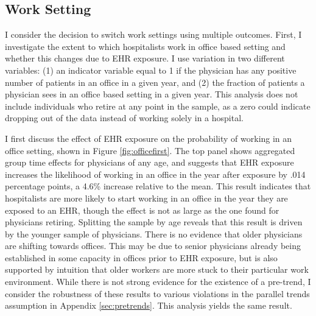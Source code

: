 \documentclass[12pt]{article}
\begin{document}
\subsection{Work Setting}

 I consider the decision to switch work settings using multiple outcomes. First, I investigate the extent to which hospitalists work in office based setting and whether this changes due to EHR exposure. I use variation in two different variables: (1) an indicator variable equal to 1 if the physician has any positive number of patients in an office in a given year, and (2) the fraction of patients a physician sees in an office based setting in a given year. This analysis does not include individuals who retire at any point in the sample, as a zero could indicate dropping out of the data instead of working solely in a hospital. 

I first discuss the effect of EHR exposure on the probability of working in an office setting, shown in Figure \ref{fig:officefirst}. The top panel shows aggregated group time effects for physicians of any age, and suggests that EHR exposure increases the likelihood of working in an office in the year after exposure by .014 percentage points, a 4.6\% increase relative to the mean. This result indicates that hospitalists are more likely to start working in an office in the year they are exposed to an EHR, though the effect is not as large as the one found for physicians retiring. Splitting the sample by age reveals that this result is driven by the younger sample of physicians. There is no evidence that older physicians are shifting towards offices. This may be due to senior physicians already being established in some capacity in offices prior to EHR exposure, but is also supported by intuition that older workers are more stuck to their particular work environment. While there is not strong evidence for the existence of a pre-trend, I consider the robustness of these results to various violations in the parallel trends assumption in Appendix \ref{sec:pretrends}. This analysis yields the same result.
\end{document}
